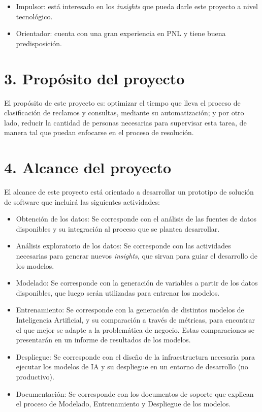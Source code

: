 \documentclass[
11pt, %
]{charter}
\begin{document}
\begin{itemize}
	\item Impulsor: está interesado en los \textit{insights} que pueda darle este proyecto a nivel tecnológico.
	\item Orientador: cuenta con una gran experiencia en PNL y tiene buena predisposición.
\end{itemize}



\section{3. Propósito del proyecto}
\label{sec:proposito}

El propósito de este proyecto es: optimizar el tiempo que lleva el proceso de clasificación de reclamos y consultas, mediante su automatización; y por otro lado, reducir la cantidad de personas necesarias para supervisar esta tarea, de manera tal que puedan enfocarse en el proceso de resolución.

\section{4. Alcance del proyecto}
\label{sec:alcance}

El alcance de este proyecto está orientado a desarrollar un prototipo de solución de software que incluirá las siguientes actividades:

\begin{itemize}
	\item Obtención de los datos: Se corresponde con el análisis de las fuentes de datos disponibles y su integración al proceso que se plantea desarrollar.
	\item Análisis exploratorio de los datos: Se corresponde con las actividades necesarias para generar nuevos \textit{insights}, que sirvan para guiar el desarrollo de los modelos.
	\item Modelado: Se corresponde con la generación de variables a partir de los datos disponibles, que luego serán utilizadas para entrenar los modelos. 
	\item Entrenamiento: Se corresponde con la generación de distintos modelos de Inteligencia Artificial, y su comparación a través de métricas, para encontrar el que mejor se adapte a la problemática de negocio. Estas comparaciones se presentarán en un informe de resultados de los modelos.
	\item Despliegue: Se corresponde con el diseño de la infraestructura necesaria para ejecutar los modelos de IA y su despliegue en un entorno de desarrollo (no productivo).
	\item Documentación: Se corresponde con los documentos de soporte que explican el proceso de Modelado, Entrenamiento y Despliegue de los modelos.
\end{itemize}
\end{document}
